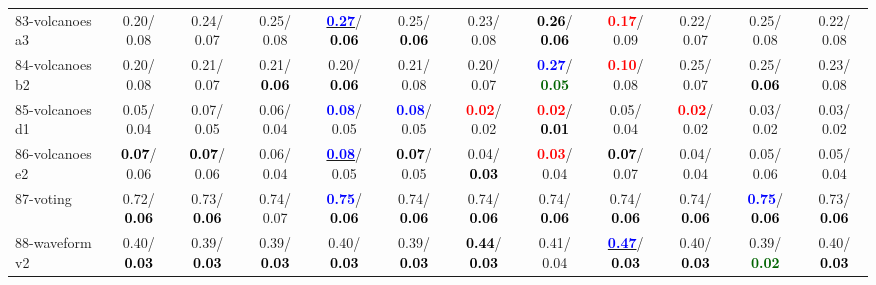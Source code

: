 \begin{table}[h]
\begin{center}
{\begin{tabular}{lc|c|c|c|c|c|c|c|c|c|c}
83-volcanoes a3 &   0.20/  0.08 &   0.24/  0.07 &   0.25/  0.08 & \underline{\textcolor{blue}{\textbf{  0.27}}}/\textcolor{black}{\textbf{  0.06}} &   0.25/\textcolor{black}{\textbf{  0.06}} &   0.23/  0.08 & \textcolor{black}{\textbf{  0.26}}/\textcolor{black}{\textbf{  0.06}} & \textcolor{red}{\textbf{  0.17}}/  0.09 &   0.22/  0.07 &   0.25/  0.08 &   0.22/  0.08 \\
84-volcanoes b2 &   0.20/  0.08 &   0.21/  0.07 &   0.21/\textcolor{black}{\textbf{  0.06}} &   0.20/\textcolor{black}{\textbf{  0.06}} &   0.21/  0.08 &   0.20/  0.07 & \textcolor{blue}{\textbf{  0.27}}/\textcolor{darkgreen}{\textbf{  0.05}} & \textcolor{red}{\textbf{  0.10}}/  0.08 &   0.25/  0.07 &   0.25/\textcolor{black}{\textbf{  0.06}} &   0.23/  0.08 \\
85-volcanoes d1 &   0.05/  0.04 &   0.07/  0.05 &   0.06/  0.04 & \textcolor{blue}{\textbf{  0.08}}/  0.05 & \textcolor{blue}{\textbf{  0.08}}/  0.05 & \textcolor{red}{\textbf{  0.02}}/  0.02 & \textcolor{red}{\textbf{  0.02}}/\textcolor{black}{\textbf{  0.01}} &   0.05/  0.04 & \textcolor{red}{\textbf{  0.02}}/  0.02 &   0.03/  0.02 &   0.03/  0.02 \\ \hline
86-volcanoes e2 & \textcolor{black}{\textbf{  0.07}}/  0.06 & \textcolor{black}{\textbf{  0.07}}/  0.06 &   0.06/  0.04 & \underline{\textcolor{blue}{\textbf{  0.08}}}/  0.05 & \textcolor{black}{\textbf{  0.07}}/  0.05 &   0.04/\textcolor{black}{\textbf{  0.03}} & \textcolor{red}{\textbf{  0.03}}/  0.04 & \textcolor{black}{\textbf{  0.07}}/  0.07 &   0.04/  0.04 &   0.05/  0.06 &   0.05/  0.04 \\
87-voting &   0.72/\textcolor{black}{\textbf{  0.06}} &   0.73/\textcolor{black}{\textbf{  0.06}} &   0.74/  0.07 & \textcolor{blue}{\textbf{  0.75}}/\textcolor{black}{\textbf{  0.06}} &   0.74/\textcolor{black}{\textbf{  0.06}} &   0.74/\textcolor{black}{\textbf{  0.06}} &   0.74/\textcolor{black}{\textbf{  0.06}} &   0.74/\textcolor{black}{\textbf{  0.06}} &   0.74/\textcolor{black}{\textbf{  0.06}} & \textcolor{blue}{\textbf{  0.75}}/\textcolor{black}{\textbf{  0.06}} &   0.73/\textcolor{black}{\textbf{  0.06}} \\
88-waveform v2 &   0.40/\textcolor{black}{\textbf{  0.03}} &   0.39/\textcolor{black}{\textbf{  0.03}} &   0.39/\textcolor{black}{\textbf{  0.03}} &   0.40/\textcolor{black}{\textbf{  0.03}} &   0.39/\textcolor{black}{\textbf{  0.03}} & \textcolor{black}{\textbf{  0.44}}/\textcolor{black}{\textbf{  0.03}} &   0.41/  0.04 & \underline{\textcolor{blue}{\textbf{  0.47}}}/\textcolor{black}{\textbf{  0.03}} &   0.40/\textcolor{black}{\textbf{  0.03}} &   0.39/\textcolor{darkgreen}{\textbf{  0.02}} &   0.40/\textcolor{black}{\textbf{  0.03}} \\

\end{tabular}}
\end{center}
\end{table}
